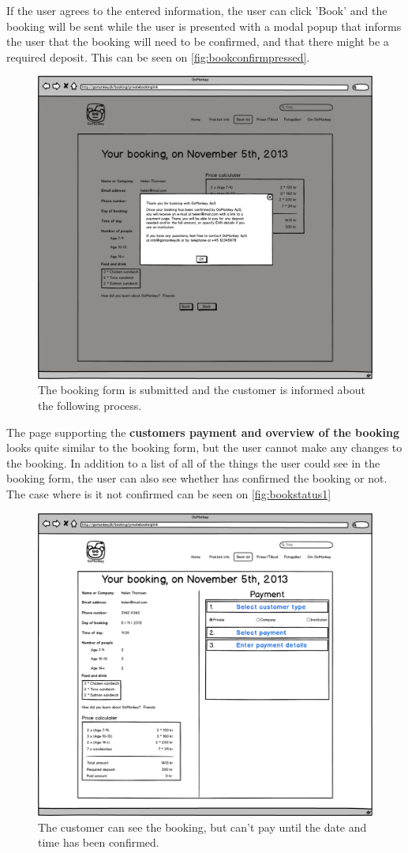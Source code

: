 If the user agrees to the entered information, the
user can click 'Book' and the booking will be sent while the user is presented
with a modal popup that informs the user that the booking will need to be confirmed,
and that there might be a required deposit. This can be seen on 
\autoref{fig:bookconfirmpressed}.

\begin{figure}[htbp]
    \centering
        \includegraphics[width=.6\textwidth]{figures/mockup/booking_confirmation_bookpressed.png}
	    \caption{The booking form is submitted and the customer is informed about the following process.}
        \label{fig:bookconfirmpressed}
\end{figure}

\FloatBarrier
\newpage

The page supporting the \textbf{customers payment and overview of the booking} 
looks quite similar to the booking form, but the 
user cannot make any changes to the booking. In addition to a list of all of 
the things the user could see in the booking form, the user can also see 
whether \gomonkey{} has confirmed the booking or not. The case where is it not confirmed can be seen on \autoref{fig:bookstatus1}

\begin{figure}[htbp]
    \centering
        \includegraphics[width=.6\textwidth]{figures/mockup/booking_payment_1.png}
	    \caption{The customer can see the booking, but can't pay until the date and time has been confirmed.}
        \label{fig:bookstatus1}
\end{figure}

